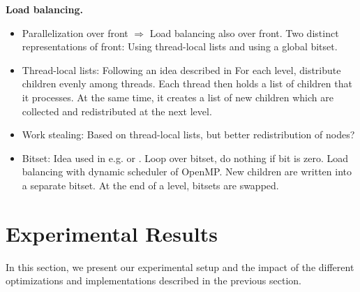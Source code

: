 \documentclass[letterpaper]{article}
\newcommand{\mypar}[1]{{\bf #1.}}
\begin{document}
\begin{invisible}
 \mypar{Load balancing}
 \begin{itemize}
  \item Parallelization over front $\Rightarrow$ Load balancing also over front. Two distinct representations of front: Using thread-local lists and using a global bitset.
  \item Thread-local lists: Following an idea described in \cite{bulucc2011parallel} %
  For each level, distribute children evenly among threads. Each thread then holds a list of children that it processes.
  At the same time, it creates a list of new children which are collected and redistributed at the next level.
  \item Work stealing: Based on thread-local lists, but better redistribution of nodes?
  \item Bitset: Idea used in e.g. \cite{agarwal2010scalable} or \cite{beamer2013direction}. Loop over bitset, do nothing if bit is zero. Load balancing with dynamic scheduler of OpenMP.
  New children are written into a separate bitset. At the end of a level, bitsets are swapped.
 \end{itemize}

\end{invisible}

\section{Experimental Results}\label{sec:exp}
In this section, we present our experimental setup and the impact of the different optimizations and implementations described in the previous section.
\end{document}
